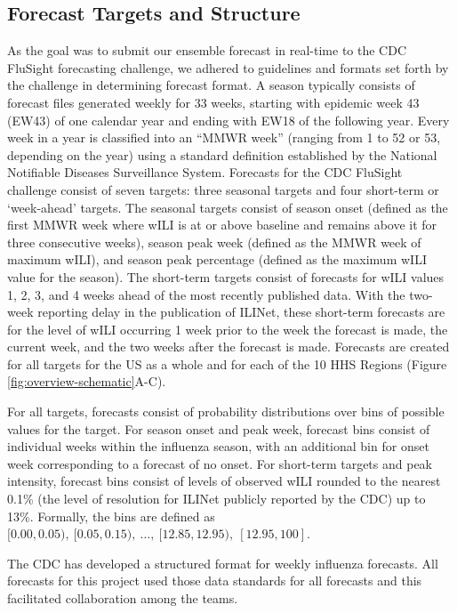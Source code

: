 \documentclass{article}\usepackage[]{graphicx}\usepackage[]{color}
\begin{document}
\subsection*{Forecast Targets and Structure}
As the goal was to submit our ensemble forecast in real-time to the CDC FluSight forecasting challenge, we adhered to guidelines and formats set forth by the challenge in determining forecast format.
A season typically consists of forecast files generated weekly for 33 weeks, starting with epidemic week 43 (EW43) of one calendar year and ending with EW18 of the following year.
Every week in a year is classified into an ``MMWR week'' (ranging from 1 to 52 or 53, depending on the year) using a standard definition established by the National Notifiable Diseases Surveillance System.\cite{NewMexicoDepartmentofHealth,Niemi2015,Tushar2018}
Forecasts for the CDC FluSight challenge consist of seven targets: three seasonal targets and four short-term or `week-ahead' targets. 
The seasonal targets consist of season onset (defined as the first MMWR week where wILI is at or above baseline and remains above it for three consecutive weeks), season peak week (defined as the MMWR week of maximum wILI), and season peak percentage (defined as the maximum wILI value for the season). The short-term targets consist of forecasts for wILI values 1, 2, 3, and 4 weeks ahead of the most recently published data. With the two-week reporting delay in the publication of ILINet, these short-term forecasts are for the level of wILI occurring 1 week prior to the week the forecast is made, the current week, and the two weeks after the forecast is made. Forecasts are created for all targets for the US as a whole and for each of the 10 HHS Regions (Figure \ref{fig:overview-schematic}A-C).

For all targets, forecasts consist of probability distributions over bins of possible values for the target. For season onset and peak week, forecast bins consist of individual weeks within the influenza season, with an additional bin for onset week corresponding to a forecast of no onset. For short-term targets and peak intensity, forecast bins consist of levels of observed wILI rounded to the nearest 0.1\% (the level of resolution for ILINet publicly reported by the CDC) up to 13\%. Formally, the bins are defined as $[0.00, 0.05),\ [0.05, 0.15),\ \dots,\ [12.85, 12.95),\ [12.95, 100]$. 

The CDC has developed a structured format for weekly influenza forecasts. All forecasts for this project used those data standards for all forecasts and this facilitated collaboration among the teams.
\end{document}
